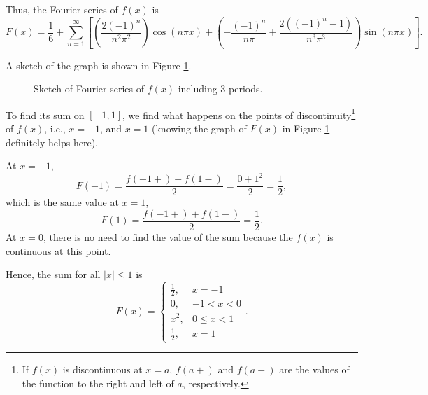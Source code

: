 \documentclass[11pt]{article}
\begin{document}
\begin{solution}
Thus, the Fourier series of $f(x)$ is
\[\boxed{F(x) = \frac{1}{6}+\sum_{n=1}^{\infty}\left[\left( \frac{2(-1)^{n}}{n^{2}\pi^{2}} \right)\cos\left(n\pi x\right) + \left( -\frac{(-1)^{n}}{n\pi} + \frac{2((-1)^{n}-1)}{n^{3}\pi^{3}} \right)\sin \left(n\pi x\right)\right]}.\]

A sketch of the graph is shown in Figure \ref{fig:prob3}. 
\begin{figure}[h]
\begin{center}
\end{center}
\caption{Sketch of Fourier series of $f(x)$ including 3 periods.}
\label{fig:prob3}
\end{figure}


To find its sum on $[-1,1]$, we find what happens on the points of discontinuity\footnote{If $f(x)$ is discontinuous at $x=a$, $f(a+)$ and $f(a-)$ are the values of the function to the right and left of $a$, respectively.} of $f(x)$, i.e., $x=-1$, and $x=1$ (knowing the graph of $F(x)$ in Figure \ref{fig:prob3} definitely helps here). 

At $x=-1$,
\[F(-1)=\dfrac{f(-1+)+f(1-)}{2}=\frac{0+1^2}{2}=\dfrac{1}{2},\]
which is the same value at $x=1$,
\[F(1)=\dfrac{f(-1+)+f(1-)}{2}=\dfrac{1}{2}.\]
At $x=0$, there is no need to find the value of the sum because the $f(x)$ is continuous at this point.

Hence, the sum for all $|x|\leq1$ is 
\begin{equation*}
\boxed{F(x) = \left\{ \begin{array}{lr} \frac{1}{2}, & x=-1 \\
                                 0, & -1 < x < 0 \\
                                 x^{2}, & 0 \leq x < 1 \\
                                 \frac{1}{2}, & x=1 \end{array} \right..}
\end{equation*}


\end{solution}
\end{document}
